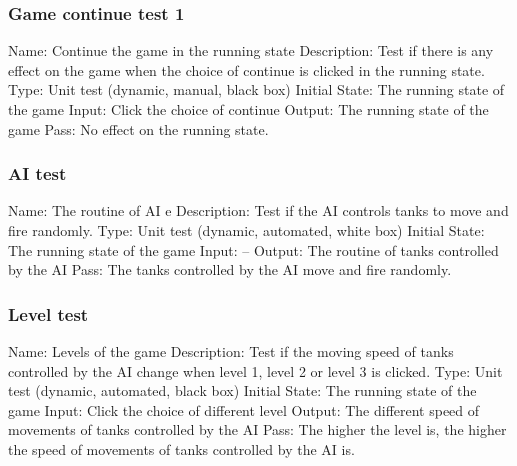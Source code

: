 \documentclass{article}
\begin{document}
\subsubsection{Game continue test 1}
Name:  Continue the game in the running state\newline
Description: Test if there is any effect on the game when the choice of continue is clicked in the running state. \newline
Type: Unit test (dynamic, manual, black box) \newline
Initial State: The running state of the game \newline
Input: Click the choice of continue \newline
Output: The running state of the game \newline
Pass: No effect on the running state. \newline

\subsubsection{AI test}
Name:  The routine of AI e\newline
Description: Test if the AI controls tanks to move and fire randomly. \newline
Type: Unit test (dynamic, automated, white box) \newline
Initial State: The running state of the game \newline
Input: -- \newline
Output: The routine of tanks controlled by the AI \newline
Pass: The tanks controlled by the AI move and fire randomly. \newline

\subsubsection{Level test}
Name:  Levels of the game\newline
Description: Test if the moving speed of tanks controlled by the AI change when level 1, level 2 or level 3 is clicked. \newline
Type: Unit test (dynamic, automated, black box) \newline
Initial State:  The running state of the game \newline
Input: Click the choice of different level\newline
Output: The different speed of movements of tanks controlled by the AI \newline
Pass: The higher the level is, the higher the speed of movements of tanks controlled by the AI is. \newline
\end{document}
